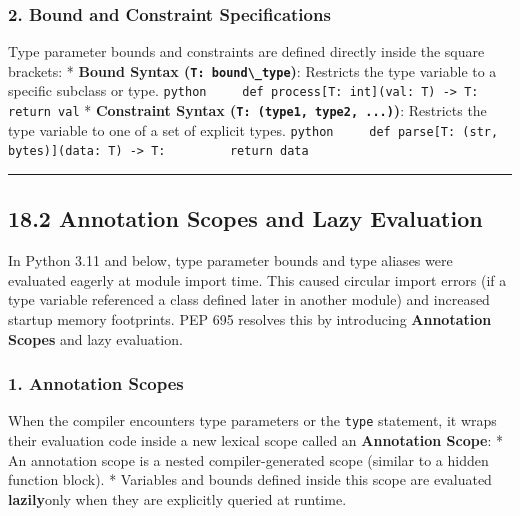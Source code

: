 \hypertarget{bound-and-constraint-specifications}{%
\subsubsection{2. Bound and Constraint
Specifications}\label{bound-and-constraint-specifications}}

Type parameter bounds and constraints are defined directly inside the
square brackets: * \textbf{Bound Syntax
(\passthrough{\lstinline!T: bound\_type!})}: Restricts the type variable
to a specific subclass or type.
\passthrough{\lstinline!python     def process[T: int](val: T) -> T:         return val!}
* \textbf{Constraint Syntax
(\passthrough{\lstinline!T: (type1, type2, ...)!})}: Restricts the type
variable to one of a set of explicit types.
\passthrough{\lstinline!python     def parse[T: (str, bytes)](data: T) -> T:         return data!}

\begin{center}\rule{0.5\linewidth}{0.5pt}\end{center}

\hypertarget{annotation-scopes-and-lazy-evaluation}{%
\subsection{18.2 Annotation Scopes and Lazy
Evaluation}\label{annotation-scopes-and-lazy-evaluation}}

In Python 3.11 and below, type parameter bounds and type aliases were
evaluated eagerly at module import time. This caused circular import
errors (if a type variable referenced a class defined later in another
module) and increased startup memory footprints. PEP 695 resolves this
by introducing \textbf{Annotation Scopes} and lazy evaluation.

\hypertarget{annotation-scopes}{%
\subsubsection{1. Annotation Scopes}\label{annotation-scopes}}

When the compiler encounters type parameters or the
\passthrough{\lstinline!type!} statement, it wraps their evaluation code
inside a new lexical scope called an \textbf{Annotation Scope}: * An
annotation scope is a nested compiler-generated scope (similar to a
hidden function block). * Variables and bounds defined inside this scope
are evaluated \textbf{lazily}only when they are explicitly queried at
runtime.

